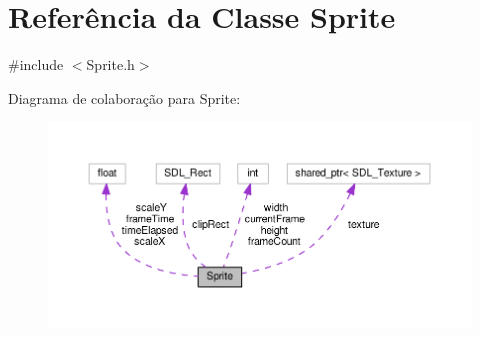 \hypertarget{classSprite}{\section{Referência da Classe Sprite}
\label{classSprite}
}


{\ttfamily \#include $<$Sprite.\+h$>$}



Diagrama de colaboração para Sprite\+:
\nopagebreak
\begin{figure}[H]
\begin{center}
\leavevmode
\includegraphics[width=350pt]{classSprite__coll__graph}
\end{center}
\end{figure}

